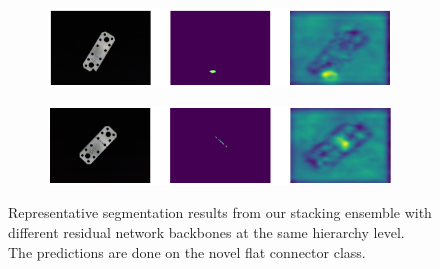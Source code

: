 \begin{figure}[htbp]
\begin{subfigure}[b]{0.3\textwidth}
    \end{subfigure}
    \begin{subfigure}[b]{0.3\textwidth}
        \centering
        \includegraphics[width=\textwidth]{figures/ensembleimagesFC/image_prediction_073.png}


    \end{subfigure}
    \begin{subfigure}[b]{0.3\textwidth}
        \centering
        \includegraphics[width=\textwidth]{figures/ensembleimagesFC/image_prediction_085.png}


    \end{subfigure}
    \caption{Representative segmentation results from our stacking ensemble with different residual network backbones at the same hierarchy level. The predictions are done on the novel flat 
             connector class.}
    \label{fig:ensembleFCimages}
\end{figure}
